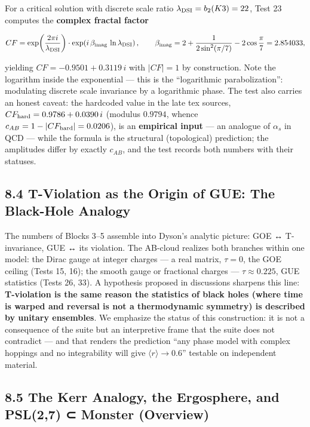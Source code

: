 \documentclass[
]{article}
\begin{document}
For a critical solution with discrete scale ratio
\(\lambda_{\rm DSI} = b_2(K3) = 22\), Test 23 computes the
\textbf{complex fractal factor}

\[CF = \exp\!\left(\frac{2\pi i}{\lambda_{\rm DSI}}\right)\cdot\exp\!\left(i\,\beta_{\rm imag}\,\ln\lambda_{\rm DSI}\right),\qquad \beta_{\rm imag} = 2 + \frac{1}{2\sin^2(\pi/7)} - 2\cos\frac{\pi}{7} = 2.854033,\]

yielding \(CF = -0.9501 + 0.3119\,i\) with \(|CF| = 1\) by construction.
Note the logarithm inside the exponential --- this is the ``logarithmic
parabolization'': modulating discrete scale invariance by a logarithmic
phase. The test also carries an honest caveat: the hardcoded value in
the late tex sources, \(CF_{\rm hard} = 0.9786 + 0.0390\,i\) (modulus
\(0.9794\), whence \(c_{AB} = 1-|CF_{\rm hard}| = 0.0206\)), is an
\textbf{empirical input} --- an analogue of \(\alpha_s\) in QCD ---
while the formula is the structural (topological) prediction; the
amplitudes differ by exactly \(c_{AB}\), and the test records both
numbers with their statuses.

\subsection{8.4 T-Violation as the Origin of GUE: The Black-Hole
Analogy}\label{t-violation-as-the-origin-of-gue-the-black-hole-analogy}

The numbers of Blocks 3--5 assemble into Dyson's analytic picture: GOE ↔
T-invariance, GUE ↔ its violation. The AB-cloud realizes both branches
within one model: the Dirac gauge at integer charges --- a real matrix,
\(\tau=0\), the GOE ceiling (Tests 15, 16); the smooth gauge or
fractional charges --- \(\tau\approx0.225\), GUE statistics (Tests 26,
33). A hypothesis proposed in discussions sharpens this line:
\textbf{T-violation is the same reason the statistics of black holes
(where time is warped and reversal is not a thermodynamic symmetry) is
described by unitary ensembles}. We emphasize the status of this
construction: it is not a consequence of the suite but an interpretive
frame that the suite does not contradict --- and that renders the
prediction ``any phase model with complex hoppings and no integrability
will give \(\langle r\rangle\to0.6\)'' testable on independent material.

\subsection{8.5 The Kerr Analogy, the Ergosphere, and PSL(2,7) ⊂ Monster
(Overview)}\label{the-kerr-analogy-the-ergosphere-and-psl27-monster-overview}
\end{document}

